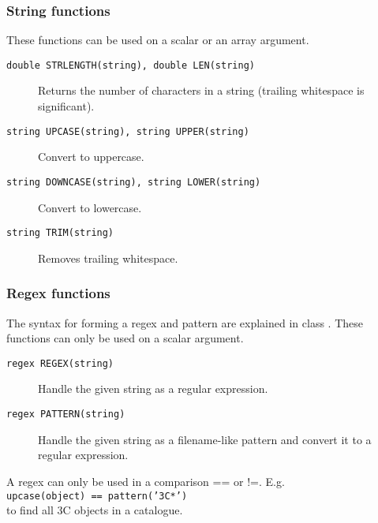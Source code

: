 \subsubsection{String functions}
These functions can be used on a scalar or an array argument.
\begin{description}
  \item[ \texttt{double STRLENGTH(string),  double LEN(string)}]
       Returns the number of characters in a string
       (trailing whitespace is significant).
  \item[ \texttt{string UPCASE(string), string UPPER(string) }]
        Convert to uppercase.
  \item[ \texttt{string DOWNCASE(string),  string LOWER(string)}]
        Convert to lowercase.
  \item[ \texttt{string TRIM(string)}]
       Removes trailing whitespace.
\end{description}

\subsubsection{Regex functions}
The syntax for forming a regex and pattern are explained in class
.
These functions can only be used on a scalar argument.

\begin{description}
  \item[ \texttt{regex REGEX(string)}]
       Handle the given string as a regular expression.
  \item[ \texttt{regex PATTERN(string)}]
       Handle the given string as a filename-like pattern and
       convert it to a regular expression.
\end{description}
A regex can only be used in a comparison == or !=. E.g.
\\\texttt{upcase(object) == pattern('3C*')}
\\to find all 3C objects in a catalogue.

